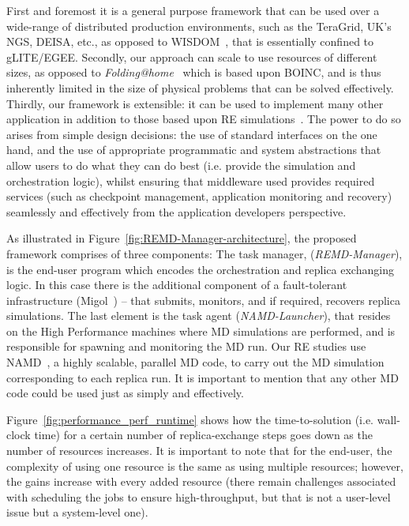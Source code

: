 \documentclass[10pt,letterpaper]{article}
\begin{document}
First and foremost it is a general purpose framework that can be used
over a wide-range of distributed production environments, such as the
TeraGrid, UK's NGS, DEISA, etc., as opposed to WISDOM~\cite{wisdom},
that is essentially confined to gLITE/EGEE. Secondly, our approach can
scale to use resources of different sizes, as opposed to {\it
  Folding@home}~\cite{folding} which is based upon BOINC, and is thus
inherently limited in the size of physical problems that can be solved
effectively.  Thirdly, our framework is extensible: it can be used
to implement many other application in addition to those based upon RE
simulations~\cite{escience07}. The power to do so arises from simple
design decisions: the use of standard interfaces on the one hand, and
the use of appropriate programmatic and system abstractions that allow
users to do what they can do best (i.e. provide the simulation and
orchestration logic), whilst ensuring that middleware used provides
required services (such as checkpoint management, application
monitoring and recovery) seamlessly and effectively from the
application developers perspective.

As illustrated in Figure~\ref{fig:REMD-Manager-architecture}, the
proposed framework comprises of three components: The task manager,
(\emph{REMD-Manager}), is the end-user program which
encodes the orchestration and replica exchanging logic.  In this
case there is the additional component of a fault-tolerant
infrastructure (Migol~\cite{migol,Luckow:2008xy}) -- that submits, monitors, and if required,
recovers replica simulations.  The last element is the task agent 
(\emph{NAMD-Launcher}), that resides on the High Performance machines
where MD simulations are performed, and is responsible for spawning and
monitoring the MD run. Our RE studies use
NAMD~\cite{Phillips:2005gd}, a highly scalable, parallel MD code, 
to carry out the MD simulation corresponding to each replica
run. It is important to mention that any other MD code could be used
just as simply and effectively.


Figure~\ref{fig:performance_perf_runtime} shows how the
time-to-solution (i.e. wall-clock time) for a certain number of
replica-exchange steps goes down as the number of resources increases.
It is important to note that for the end-user, the complexity of using
one resource is the same as using multiple resources; however, the
gains increase with every added resource (there remain challenges
associated with scheduling the jobs to ensure high-throughput, but
that is not a user-level issue but a system-level one).
\end{document}
